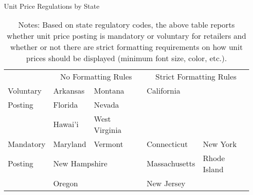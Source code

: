 \begin{table}[!htbp] \centering
\caption{Unit Price Regulations by State}
\label{tab:unitPriceLawTable}
\begin{tabular}{p{} | p{} p{} | p{} p{}|}
    \multicolumn{1}{l}{}  & \multicolumn{2}{c}{No Formatting Rules} & \multicolumn{2}{c}{Strict Formatting Rules} \\
    \cline{2-5}
  Voluntary & Arkansas & Montana & California & \\
  Posting   & Florida   & Nevada &            & \\
            & Hawai'i & West Virginia &       & \\
               \cline{2-5}
 Mandatory & Maryland & Vermont & Connecticut & New York \\
 Posting    & \multicolumn{2}{l|}{New Hampshire}    & Massachusetts & Rhode Island \\
            & Oregon        &   & New Jersey    &       \\
                            \cline{2-5}
\end{tabular}
\caption*{Notes: Based on state regulatory codes, the above table reports whether unit price posting is mandatory or voluntary for retailers and whether or not there are strict formatting requirements on how unit prices should be displayed (minimum font size, color, etc.).}
\end{table}
